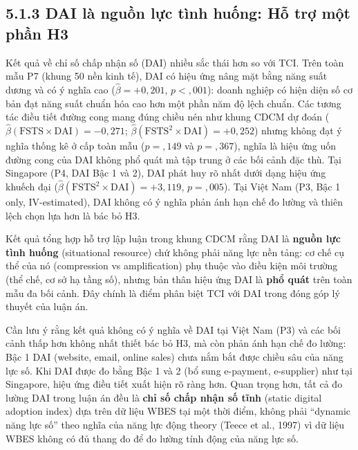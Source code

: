 \documentclass[
  a4paper,
  13pt]{extreport}
\begin{document}
\hypertarget{dai-luxe0-nguux1ed3n-lux1ef1c-tuxecnh-huux1ed1ng-hux1ed7-trux1ee3-mux1ed9t-phux1ea7n-h3}{%
\subsection{5.1.3 DAI là nguồn lực tình huống: Hỗ trợ một phần
H3}\label{dai-luxe0-nguux1ed3n-lux1ef1c-tuxecnh-huux1ed1ng-hux1ed7-trux1ee3-mux1ed9t-phux1ea7n-h3}}

Kết quả về chỉ số chấp nhận số (DAI) nhiều sắc thái hơn so với TCI. Trên
toàn mẫu P7 (khung 50 nền kinh tế), DAI có hiệu ứng nâng mặt bằng năng
suất dương và có ý nghĩa cao (\(\hat{\beta} = +0{,}201\),
\(p < {,}001\)): doanh nghiệp có hiện diện số cơ bản đạt năng suất chuẩn
hóa cao hơn một phần năm độ lệch chuẩn. Các tương tác điều tiết đường
cong mang đúng chiều nén như khung CDCM dự đoán
(\(\hat{\beta}(\text{FSTS} \times \text{DAI}) = -0{,}271\);
\(\hat{\beta}(\text{FSTS}^2 \times \text{DAI}) = +0{,}252\)) nhưng không
đạt ý nghĩa thống kê ở cấp toàn mẫu (\(p = {,}149\) và \(p = {,}367\)),
nghĩa là hiệu ứng uốn đường cong của DAI không phổ quát mà tập trung ở
các bối cảnh đặc thù. Tại Singapore (P4, DAI Bậc 1 và 2), DAI phát huy
rõ nhất dưới dạng hiệu ứng khuếch đại
(\(\hat{\beta}(\text{FSTS}^2 \times \text{DAI}) = +3{,}119\),
\(p = {,}005\)). Tại Việt Nam (P3, Bậc 1 only, IV-estimated), DAI không
có ý nghĩa phản ánh hạn chế đo lường và thiên lệch chọn lựa hơn là bác
bỏ H3.

Kết quả tổng hợp hỗ trợ lập luận trong khung CDCM rằng DAI là
\textbf{nguồn lực tình huống} (situational resource) chứ không phải năng
lực nền tảng: cơ chế cụ thể của nó (compression vs amplification) phụ
thuộc vào điều kiện môi trường (thể chế, cơ sở hạ tầng số), nhưng bản
thân hiệu ứng DAI là \textbf{phổ quát} trên toàn mẫu đa bối cảnh. Đây
chính là điểm phân biệt TCI với DAI trong đóng góp lý thuyết của luận
án.

Cần lưu ý rằng kết quả không có ý nghĩa về DAI tại Việt Nam (P3) và các
bối cảnh thấp hơn không nhất thiết bác bỏ H3, mà còn phản ánh hạn chế đo
lường: Bậc 1 DAI (website, email, online sales) chưa nắm bắt được chiều
sâu của năng lực số. Khi DAI được đo bằng Bậc 1 và 2 (bổ sung e-payment,
e-supplier) như tại Singapore, hiệu ứng điều tiết xuất hiện rõ ràng hơn.
Quan trọng hơn, tất cả đo lường DAI trong luận án đều là \textbf{chỉ số
chấp nhận số tĩnh} (static digital adoption index) dựa trên dữ liệu WBES
tại một thời điểm, không phải ``dynamic năng lực số'' theo nghĩa của
năng lực động theory (Teece et al., 1997) vì dữ liệu WBES không có đủ
thang đo để đo lường tính động của năng lực số.
\end{document}
